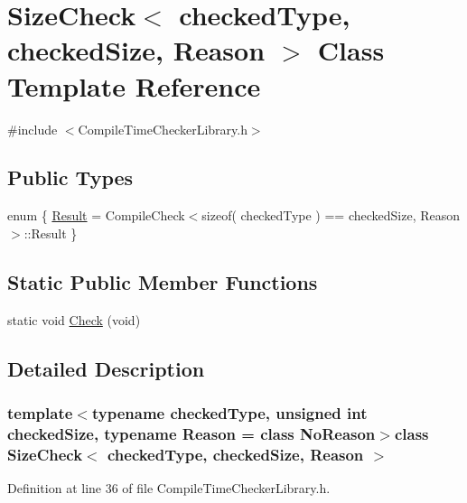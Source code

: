 \hypertarget{class_size_check}{\section{Size\-Check$<$ checked\-Type, checked\-Size, Reason $>$ Class Template Reference}
\label{class_size_check}
}


{\ttfamily \#include $<$Compile\-Time\-Checker\-Library.\-h$>$}

\subsection*{Public Types}
\begin{DoxyCompactItemize}
\item 
enum \{ \hyperlink{class_size_check_a63104e95e61670b9f2b89af60512c866a8eec13abbe1b0ca10baf99b76909c77f}{Result} = Compile\-Check$<$sizeof( checked\-Type ) == checked\-Size, Reason$>$\-:\-:Result
 \}
\end{DoxyCompactItemize}
\subsection*{Static Public Member Functions}
\begin{DoxyCompactItemize}
\item 
static void \hyperlink{class_size_check_a5e3ffed91b912bc4b3f8b3290dc64351}{Check} (void)
\end{DoxyCompactItemize}


\subsection{Detailed Description}
\subsubsection*{template$<$typename checked\-Type, unsigned int checked\-Size, typename Reason = class No\-Reason$>$class Size\-Check$<$ checked\-Type, checked\-Size, Reason $>$}



Definition at line 36 of file Compile\-Time\-Checker\-Library.\-h.



